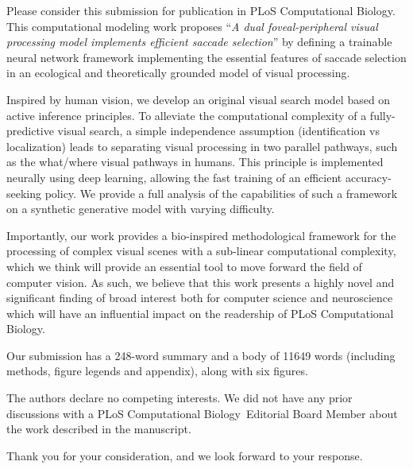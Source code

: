 \documentclass[stdletter,8pt,dateno]{newlfm}%
\newcommand{\Title}{A dual foveal-peripheral visual processing model implements efficient saccade selection}
\newcommand{\Journal}{PLoS Computational Biology}%
\begin{document}
\begin{newlfm}
%
Please consider this submission for publication in \Journal . This computational modeling work proposes ``\emph{\Title}'' by defining a trainable neural network framework implementing the essential features of saccade selection in an ecological and theoretically grounded model of visual processing.

Inspired by human vision, we develop an original visual search model based on active inference principles. To alleviate the computational complexity of a fully-predictive visual search, a simple independence assumption (identification vs localization) leads to separating  visual processing in two parallel pathways, such as the what/where visual pathways in humans. This principle is implemented neurally using deep learning, allowing the fast training of an efficient accuracy-seeking policy. We provide a full analysis of the capabilities of such a framework on a synthetic generative model with varying difficulty.

Importantly, our work provides a bio-inspired methodological framework for the processing of complex visual scenes with a sub-linear computational complexity, which we think will provide an essential tool to move forward the field of computer vision. 
As such, we believe that this work presents a highly novel and significant finding of broad interest both for computer science and neuroscience 
which will have an influential impact on the readership of \Journal .

Our submission has a 248-word summary and a body of 11649 words
(including methods, figure legends and appendix), along with six figures.

The authors declare no competing interests.
We did not have any prior discussions with
a \Journal\ Editorial Board Member
about the work described in the manuscript.

Thank you for your consideration, and we look forward to your response.

\end{newlfm}
\end{document}
